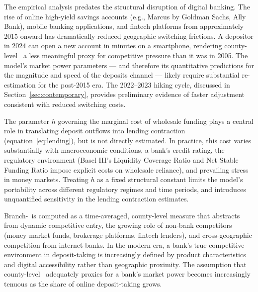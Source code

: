 \documentclass[12pt,a4paper]{article}
\newcommand{\HHI}{\text{HHI}}
\begin{document}
\begin{critbox}
The empirical analysis predates the structural disruption of digital banking.
The rise of online high-yield savings accounts (e.g., Marcus by Goldman Sachs,
Ally Bank), mobile banking applications, and fintech platforms from
approximately 2015 onward has dramatically reduced geographic switching
frictions. A depositor in 2024 can open a new account in minutes on a
smartphone, rendering county-level \HHI\ a less meaningful proxy for
competitive pressure than it was in 2005. The model's market power parameters
--- and therefore its quantitative predictions for the magnitude and speed of
the deposits channel --- likely require substantial re-estimation for the
post-2015 era. The 2022--2023 hiking cycle, discussed in
Section~\ref{sec:contemporary}, provides preliminary evidence of faster
adjustment consistent with reduced switching costs.
\end{critbox}

\begin{critbox}
The parameter $h$ governing the marginal cost of wholesale funding plays a
central role in translating deposit outflows into lending contraction
(equation~\ref{eq:lending}), but is not directly estimated. In practice, this
cost varies substantially with macroeconomic conditions, a bank's credit
rating, the regulatory environment (Basel III's Liquidity Coverage Ratio and
Net Stable Funding Ratio impose explicit costs on wholesale reliance), and
prevailing stress in money markets. Treating $h$ as a fixed structural constant
limits the model's portability across different regulatory regimes and time
periods, and introduces unquantified sensitivity in the lending contraction
estimates.
\end{critbox}

\begin{critbox}
Branch-\HHI\ is computed as a time-averaged, county-level measure that
abstracts from dynamic competitive entry, the growing role of non-bank
competitors (money market funds, brokerage platforms, fintech lenders), and
cross-geographic competition from internet banks. In the modern era, a bank's
true competitive environment in deposit-taking is increasingly defined by
product characteristics and digital accessibility rather than geographic
proximity. The assumption that county-level \HHI\ adequately proxies for a
bank's market power becomes increasingly tenuous as the share of online
deposit-taking grows.
\end{critbox}
\end{document}

